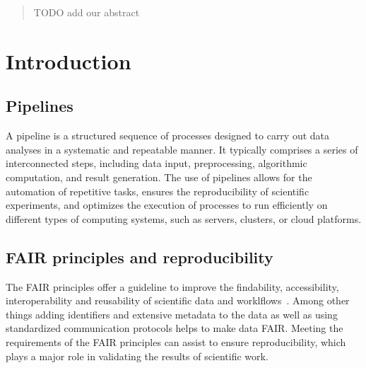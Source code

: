 \documentclass{article}
\theoremstyle{plain}
\theoremstyle{definition}
\theoremstyle{remark}
\begin{document}
\begin{abstract}
TODO add our abstract
\end{abstract}

%

\section{Introduction}
\subsection{Pipelines}
A pipeline is a structured sequence of processes designed to carry out data analyses in a systematic and repeatable manner. It typically comprises a series of interconnected steps, including data input, preprocessing, algorithmic computation, and result generation. The use of pipelines allows for the automation of repetitive tasks, ensures the reproducibility of scientific experiments, and optimizes the execution of processes to run efficiently on different types of computing systems, such as servers, clusters, or cloud platforms.
\subsection{FAIR principles and reproducibility}
The FAIR principles offer a guideline to improve the findability, accessibility, interoperability and reusability of scientific data and worklflows~\cite{wilkinson2016fair}. 
Among other things adding identifiers and extensive metadata to the data as well as using standardized communication protocols helps to make data FAIR.
Meeting the requirements of the FAIR principles can assist to ensure reproducibility, which plays a major role in validating the results of scientific work.
\end{document}

